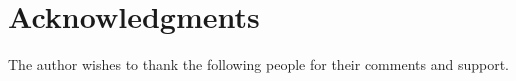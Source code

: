 \documentclass[12pt,letterpaper]{article} %
\begin{document}
\section*{Acknowledgments}

The author wishes to thank the following people for their comments and support.


\setlength{\bibsep}{0.00cm plus 0.05cm} %


\end{document}
